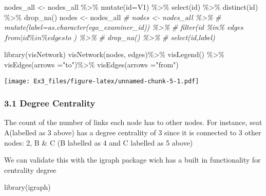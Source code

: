 \documentclass[
]{article}
\newenvironment{Shaded}{\begin{snugshade}}{\end{snugshade}}
\newcommand{\AttributeTok}[1]{\textcolor[rgb]{0.77,0.63,0.00}{#1}}
\newcommand{\CommentTok}[1]{\textcolor[rgb]{0.56,0.35,0.01}{\textit{#1}}}
\newcommand{\FunctionTok}[1]{\textcolor[rgb]{0.00,0.00,0.00}{#1}}
\newcommand{\NormalTok}[1]{#1}
\newcommand{\OtherTok}[1]{\textcolor[rgb]{0.56,0.35,0.01}{#1}}
\newcommand{\SpecialCharTok}[1]{\textcolor[rgb]{0.00,0.00,0.00}{#1}}
\newcommand{\StringTok}[1]{\textcolor[rgb]{0.31,0.60,0.02}{#1}}
\begin{document}
\begin{Shaded}
\begin{Highlighting}[]
\NormalTok{nodes\_all }\OtherTok{\textless{}{-}}\NormalTok{ nodes\_all }\SpecialCharTok{\%\textgreater{}\%}
  \FunctionTok{mutate}\NormalTok{(}\AttributeTok{id=}\NormalTok{V1) }\SpecialCharTok{\%\textgreater{}\%}
  \FunctionTok{select}\NormalTok{(id) }\SpecialCharTok{\%\textgreater{}\%}
  \FunctionTok{distinct}\NormalTok{(id) }\SpecialCharTok{\%\textgreater{}\%}
  \FunctionTok{drop\_na}\NormalTok{()}
\NormalTok{nodes }\OtherTok{\textless{}{-}}\NormalTok{ nodes\_all}
\CommentTok{\# nodes \textless{}{-} nodes\_all \%\textgreater{}\%}
\CommentTok{\#   mutate(label=as.character(ego\_examiner\_id)) \%\textgreater{}\%}
\CommentTok{\#   filter(id \%in\% edges$from | id \%in\% edges$to ) \%\textgreater{}\%}
\CommentTok{\#   drop\_na() \%\textgreater{}\%}
\CommentTok{\#   select(id,label)}
\end{Highlighting}
\end{Shaded}

\begin{Shaded}
\begin{Highlighting}[]
\FunctionTok{library}\NormalTok{(visNetwork)}
\FunctionTok{visNetwork}\NormalTok{(nodes, edges)}\SpecialCharTok{\%\textgreater{}\%}
  \FunctionTok{visLegend}\NormalTok{() }\SpecialCharTok{\%\textgreater{}\%}
  \FunctionTok{visEdges}\NormalTok{(}\AttributeTok{arrows =}\StringTok{"to"}\NormalTok{)}\SpecialCharTok{\%\textgreater{}\%}
  \FunctionTok{visEdges}\NormalTok{(}\AttributeTok{arrows =}\StringTok{"from"}\NormalTok{)}
\end{Highlighting}
\end{Shaded}

\texttt{[image: Ex3\_files/figure-latex/unnamed-chunk-5-1.pdf]}

\hypertarget{degree-centrality}{%
\subsubsection{3.1 Degree Centrality}\label{degree-centrality}}

The count of the number of links each node has to other nodes. For
instance, seat A(labelled as 3 above) has a degree centrality of 3 since
it is connected to 3 other nodes: 2, B \& C (B labelled as 4 and C
labelled as 5 above)

We can validate this with the igraph package wich has a built in
functionality for centrality degree

\begin{Shaded}
\begin{Highlighting}[]
\FunctionTok{library}\NormalTok{(igraph)}
\end{Highlighting}
\end{Shaded}
\end{document}
